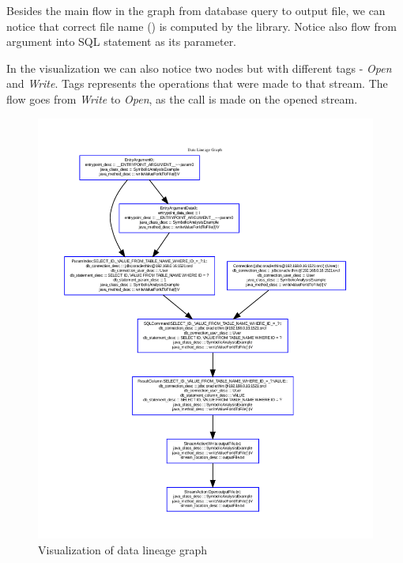 Besides the main flow in the graph from database query to output file, we can
notice that correct file name () is computed by the library.
Notice also flow from  argument into SQL statement as its parameter.

In the visualization we can also notice two  nodes but with different
tags - \textit{Open} and \textit{Write}.
Tags represents the operations that were made to that stream. The flow
goes from \textit{Write} to \textit{Open}, as the  call is made on the opened stream.

\begin{figure}[p]
  \includegraphics[trim={1cm 1cm 1cm 1.8cm},clip,width=\textwidth]{img/Examples2-writeValueForIdToFile.pdf}
  \caption{Visualization of data lineage graph}
  \label{frameworks:dbio:graph}
  \hspace{-15mm}
\end{figure}

